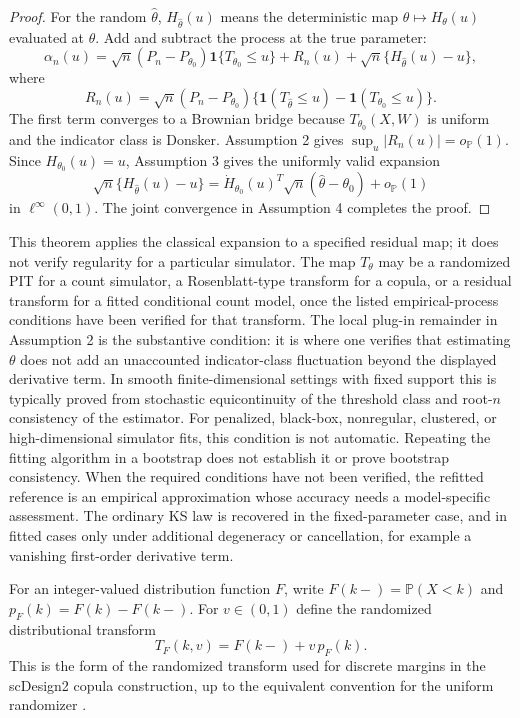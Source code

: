 \documentclass[preprint,12pt]{elsarticle}
\newcommand{\Prob}{\mathbb{P}}
\theoremstyle{plain}
\theoremstyle{remark}
\begin{document}
\begin{proof}
For the random $\widehat\theta$, $H_{\widehat\theta}(u)$ means the deterministic map
$\theta\mapsto H_\theta(u)$ evaluated at $\widehat\theta$. Add and subtract the
process at the true parameter:
\[
\alpha_n(u)
=\sqrt n(P_n-P_{\theta_0})\mathbf 1\{T_{\theta_0}\le u\}
+R_n(u)+\sqrt n\{H_{\widehat\theta}(u)-u\},
\]
where
\[
R_n(u)=\sqrt n(P_n-P_{\theta_0})
\{\mathbf 1(T_{\widehat\theta}\le u)-\mathbf 1(T_{\theta_0}\le u)\}.
\]
The first term converges to a Brownian bridge because
$T_{\theta_0}(X,W)$ is uniform and the indicator class is Donsker. Assumption 2
gives $\sup_u|R_n(u)|=o_{\mathbb P}(1)$. Since
$H_{\theta_0}(u)=u$, Assumption 3 gives the uniformly valid expansion
\[
\sqrt n\{H_{\widehat\theta}(u)-u\}
=\dot H_{\theta_0}(u)^T\sqrt n(\widehat\theta-\theta_0)+o_{\mathbb P}(1)
\]
in $\ell^\infty(0,1)$. The joint convergence in Assumption 4 completes the
proof.
\end{proof}

This theorem applies the classical expansion to a specified residual map; it
does not verify regularity for a particular simulator. The map $T_\theta$ may be a randomized
PIT for a count simulator, a Rosenblatt-type transform for a copula, or a
residual transform for a fitted conditional count model, once the listed
empirical-process conditions have been verified for that transform. The
local plug-in remainder in Assumption 2 is the substantive condition: it is
where one verifies that estimating $\theta$ does not add an unaccounted
indicator-class fluctuation beyond the displayed derivative term. In smooth
finite-dimensional settings with fixed support this is typically proved from
stochastic equicontinuity of the threshold class and root-$n$ consistency of
the estimator. For penalized, black-box, nonregular, clustered, or
high-dimensional simulator fits, this condition is not automatic. Repeating the
fitting algorithm in a bootstrap does not establish it or prove bootstrap
consistency. When the required conditions have not been verified, the
refitted reference is an empirical approximation whose accuracy needs a
model-specific assessment. The ordinary KS law is recovered in the
fixed-parameter case, and in fitted cases only under additional degeneracy or
cancellation, for example a vanishing first-order derivative term.

For an integer-valued distribution function $F$, write
$F(k-)=\Prob(X<k)$ and $p_F(k)=F(k)-F(k-)$. For $v\in(0,1)$ define the
randomized distributional transform
\[
T_F(k,v)=F(k-)+v\,p_F(k).
\]
This is the form of the randomized transform used for discrete margins in the
scDesign2 copula construction, up to the equivalent convention for the
uniform randomizer \citep{sun2021scdesign2,sun2023scdesign2correction}.
\end{document}
